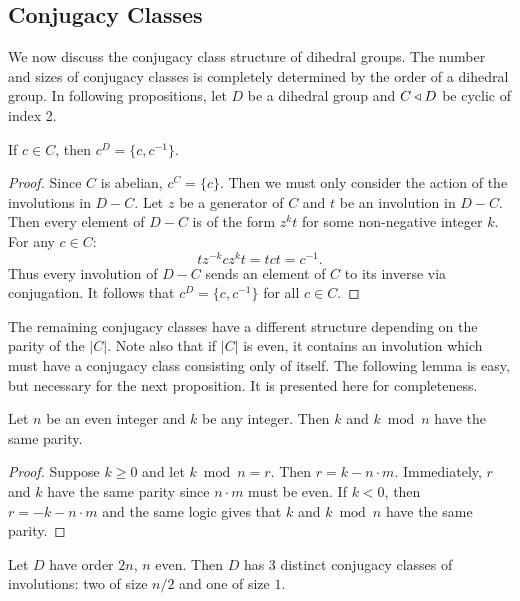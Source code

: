 \documentclass[main.tex]{subfiles}
\begin{document}
\subsection{Conjugacy Classes}

We now discuss the conjugacy class structure of dihedral groups. The number and sizes of conjugacy classes is completely determined by the order of a dihedral group. In following propositions, let $D$ be a dihedral group and $C \triangleleft D$ be cyclic of index 2.

\begin{proposition}\label{cclassstructure}
If $c \in C$, then $c^D = \{c, c^{-1}\}$.
\end{proposition}

\begin{proof}
Since $C$ is abelian, $c^C = \{c\}$. Then we must only consider the action of the involutions in $D - C$. Let $z$ be a generator of $C$ and $t$ be an involution in $D - C$. Then every element of $D - C$ is of the form $z^k t$ for some non-negative integer $k$. For any $c \in C$:
$$t z^{-k} c z^k t = t c t = c^{-1} \text{.}$$
Thus every involution of $D - C$ sends an element of $C$ to its inverse via conjugation. It follows that $c^D = \{c, c^{-1}\}$ for all $c \in C$.
\end{proof}

The remaining conjugacy classes have a different structure depending on the parity of the $|C|$.  Note also that if $|C|$ is even, it contains an involution which must have a conjugacy class consisting only of itself. The following lemma is easy, but necessary for the next proposition. It is presented here for completeness.

\begin{lemma}\label{paritylemma}
Let $n$ be an even integer and $k$ be any integer. Then $k$ and $k \bmod n$ have the same parity.
\end{lemma}

\begin{proof}
Suppose $k \ge 0$ and let $k \bmod n = r$. Then $r = k - n \cdot m$. Immediately, $r$ and $k$ have the same parity since $n \cdot m$ must be even. If $k < 0$, then $r = -k - n \cdot m$ and the same logic gives that $k$ and $k \bmod n$ have the same parity.
\end{proof}

\begin{proposition}\label{evendihedralclass}
Let $D$ have order $2n$, $n$ even. Then $D$ has 3 distinct conjugacy classes of involutions: two of size $n/2$ and one of size $1$.
\end{proposition}
\end{document}
